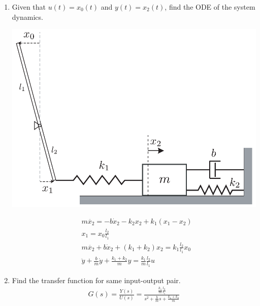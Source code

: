 \documentclass[twoside]{article}
\theoremstyle{definition}
\begin{document}
\begin{enumerate}

\item Given that $u(t) = x_0(t)$ and $y(t) = x_2(t)$,
find the ODE of the system dynamics.
 
\vspace{6pt}

  \begin{minipage}[h]{0.6\linewidth}
    \begin{center}
      \includegraphics[width=1\textwidth]{ex1}
    \end{center}
  \end{minipage}
  \begin{minipage}[h]{0.4\linewidth}
    \begin{center}
 	\begin{align*}
	&m \ddot{x_2} = - b \dot{x}_2 - k_2 x_2 + k_1 (x_1 - x_2)
	\\
	&x_1  = x_0 \frac{l_2}{l_1} 
	\\
	&m \ddot{x_2} + b \dot{x}_2 + (k_1 + k_2) x_2  =  k_1 \frac{l_2}{l_1} x_0
	\\
	&\ddot{y} + \frac{b}{m} \dot{y} + \frac{k_1 + k_2}{m} y  = 
	\frac{k_1}{m} \frac{l_2}{l_1} u
		\end{align*}
    \end{center}
  \end{minipage}
  
  \vspace{6pt}
  
  \item Find the transfer function for same input-output pair.
{\large  
\begin{align*}
G(s) = \frac{Y(s)}{U(s)} = \frac{\frac{k_1}{m} \frac{l_2}{l_1}}{s^2 + \frac{b}{m} s + \frac{k_1 + k_2}{m}}  
\end{align*}
}


\end{enumerate}
\end{document}
